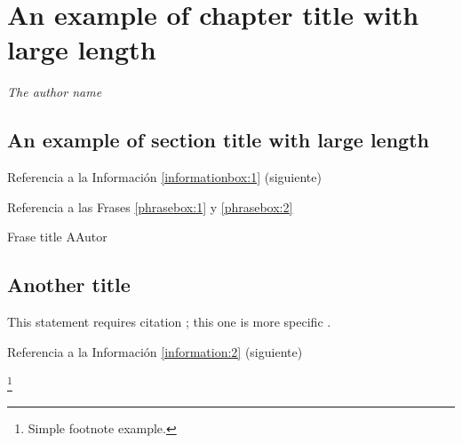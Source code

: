 \chapter{An example of chapter title with large length}

\begin{phrasebox}{}{\textit{The author name}}
\label{phrasebox:2}
\textit{\lipsum[1][1-3]}
\end{phrasebox}

\vspace{1ex}
\lipsum[1][1-4] 
\section{An example of section title with large length}

\lipsum[1][1-3] 
Referencia a la Información \ref{informationbox:1} (siguiente)

\begin{informationbox}[Título A]
\label{informationbox:1}
\lipsum[1][1-3] 
\end{informationbox}

\lipsum[1]

\lipsum[1][1-3]
Referencia a las Frases \ref{phrasebox:1} y \ref{phrasebox:2} 

\begin{phrasebox}{Frase title A}{Autor}
\label{phrasebox:1}
\lipsum[1][1-2] 
\end{phrasebox}

\lipsum[1][1-3] 

\begin{citationbox}
\lipsum[1][1-3] 
\end{citationbox}

\section{Another title}

This statement requires citation \cite{book_key}; this one is more specific \cite[122]{article_key}.
\lipsum[1][1-4]
 
Referencia a la Información \ref{information:2} (siguiente)

\begin{informationbox}[Título B]
\label{information:2}
\lipsum[1][1-3]\footnote{Simple footnote example.}
\end{informationbox}

